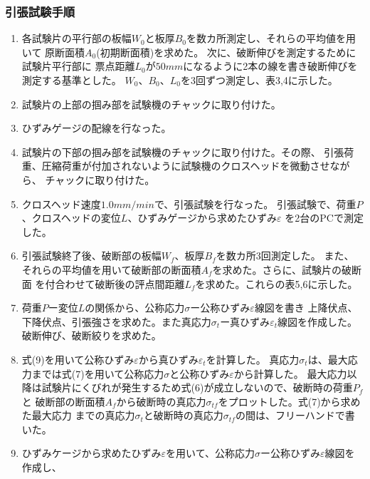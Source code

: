 \documentclass[10pt,a4j]{jsarticle}
\begin{document}
  \subsubsection{引張試験手順}
  \begin{enumerate}
    \item 各試験片の平行部の板幅$W_{0}$と板厚$B_{0}$を数カ所測定し、それらの平均値を用いて
    原断面積$A_{0}$(初期断面積)を求めた。
    次に、破断伸びを測定するために試験片平行部に
    票点距離$L_{0}$が$50mm$になるように2本の線を書き破断伸びを測定する基準とした。
    $W_{0}$、$B_{0}$、$L_{0}$を3回ずつ測定し、表3,4に示した。\\
    \item 試験片の上部の掴み部を試験機のチャックに取り付けた。 \\
    \item ひずみゲージの配線を行なった。 \\
    \item 試験片の下部の掴み部を試験機のチャックに取り付けた。その際、
    引張荷重、圧縮荷重が付加されないように試験機のクロスヘッドを微動させながら、
    チャックに取り付けた。 \\
    \item クロスヘッド速度$1.0mm/min$で、引張試験を行なった。
    引張試験で、荷重$P$、クロスヘッドの変位$L$、ひずみゲージから求めたひずみ$ε$
    を2台のPCで測定した。 \\
    \item 引張試験終了後、破断部の板幅$W_{f}$、板厚$B_{f}$を数カ所3回測定した。
    また、それらの平均値を用いて破断部の断面積$A_{f}$を求めた。さらに、試験片の破断面
    を付合わせて破断後の評点間距離$L_{f}$を求めた。これらの表5,6に示した。 \\
    \item 荷重$P$ー変位$L$の関係から、公称応力$σ$ー公称ひずみ$ε$線図を書き
    上降伏点、下降伏点、引張強さを求めた。また真応力$σ_{t}$ー真ひずみ$ε_{t}$線図を作成した。
    破断伸び、破断絞りを求めた。\\
    \item 式(9)を用いて公称ひずみ$ε$から真ひずみ$ε_{t}$を計算した。
    真応力$σ_{t}$は、最大応力までは式(7)を用いて公称応力$σ$と公称ひずみ$ε$から計算した。
    最大応力以降は試験片にくびれが発生するため式(6)が成立しないので、破断時の荷重$P_{f}$と
    破断部の断面積$A_{f}$から破断時の真応力$σ_{tf}$をプロットした。式(7)から求めた最大応力
    までの真応力$σ_{t}$と破断時の真応力$σ_{tf}$の間は、フリーハンドで書いた。\\
    \item ひずみケージから求めたひずみ$ε$を用いて、公称応力$σ$ー公称ひずみ$ε$線図を作成し、

\end{enumerate}
\end{document}
